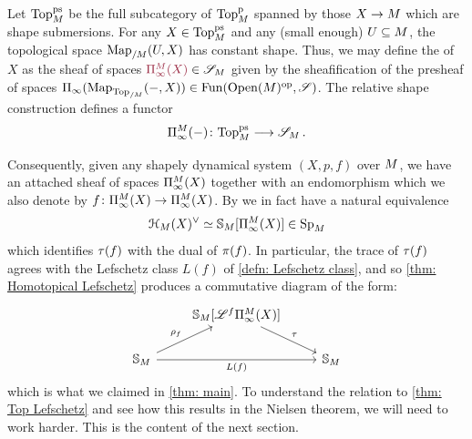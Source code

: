 \begin{cons}
    Let $\mathrm{Top}^{\mathrm{ps}}_{M}$ be the full subcategory of 
    $\mathrm{Top}^{\mathrm{p}}_{M}$ spanned by those $X\to M$ which are shape
    submersions.
    For any $X\in \mathrm{Top}^{\mathrm{ps}}_{M}$ and any (small enough) $U\subseteq M$, the 
    topological space $\operatorname{Map}_{/M}(U,X)$ has constant
    shape. Thus, we may define the  
    of $X$ as the sheaf of spaces $\mdef{\ani{X}[\base]}\in \pSpc{\base}$
    given by the sheafification of the presheaf of spaces
    $\ani{\Map_{\Top_{/\base}}(-,X)} \in \Fun(\mathrm{Open}(\base)^\op,\Spc)$. 
    The relative shape construction defines a functor
    \[ \ani{-}[\base] \colon \psTop{\base} \too \pSpc{\base}\,.\]
\end{cons}

Consequently, given any shapely dynamical system $(X,p,f)$  
over $M$, we have an attached sheaf of spaces $\ani{X}[\base]$
together with an endomorphism which we also denote by 
$f\colon \ani{X}[\base]\to \ani{X}[\base]$. By 
we in fact have a natural equivalence
\[ \cptSec{X}[\base]^{\vee}\simeq \SS_{\base}[\ani{X}[\base]]\in \pSp{\base}\]
which identifies $\tau(f)$ with the dual of $\pi(f)$. In particular, the trace
of $\tau(f)$ agrees with the Lefschetz class $L(f)$ of \cref{defn: Lefschetz class}, and so \cref{thm: Homotopical Lefschetz} produces a commutative diagram
of the form:
    \[
  \begin{tikzcd}
        {} & {\SS_{\base}[\cL^f \ani{X}[\base]]} & \\
	{\SS_{\base}} && {\SS_{\base}}
  \arrow["{\tau}", from=1-2, to=2-3]
	\arrow["{\rho_f}", from=2-1, to=1-2]
	\arrow["{L(f)}"', from=2-1, to=2-3]
\end{tikzcd}
\]
which is what we claimed in \cref{thm: main}. To understand the relation 
to \cref{thm: Top Lefschetz} and see how this results in the Nielsen theorem,
we will need to work harder. This is the content of the next section.
